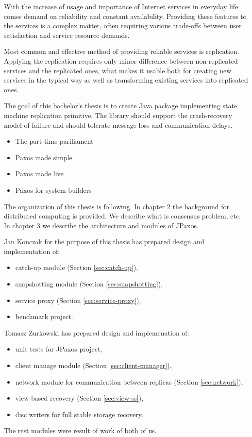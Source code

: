 
With the increase of usage and importance of Internet services in everyday life comes demand on reliability and constant availability.
Providing these features to the services is a complex matter, often requiring various trade-offs between user satisfaction and service resource demands.

Most common and effective method of providing reliable services is replication. Applying the replication requires only minor difference between non-replicated services and the replicated ones, what makes it usable both for creating new services in the typical way %
as well as transforming existing services into replicated ones.

The goal of this bachelor's thesis is to create Java package implementing state machine replication primitive. The library should support the crash-recovery model of failure and should tolerate message loss and communication delays.
 
\begin{itemize}
  \item The part-time pariliament
  \item Paxos made simple
  \item Paxos made live
  \item Paxos for system builders
\end{itemize}

The organization of this thesis is following. In chapter 2 the background for distributed computing is provided. We describe what is consensus problem, etc. In chapter 3 we describe the architecture and modules of JPaxos.

Jan Konczak for the purpose of this thesis has prepared design and implementation of:
\begin{itemize}
  \item catch-up module (Section \ref{sec:catch-up}),
  \item snapshotting module (Section \ref{sec:snapshotting}),
  \item service proxy (Section \ref{sec:service-proxy}),
  \item benchmark project.
\end{itemize}

Tomasz Zurkowski has prepared design and implemenation of:
\begin{itemize}
  \item unit tests for JPaxos project,
  \item client manage module (Section \ref{sec:client-manager}), 
  \item network module for communication between replicas (Section \ref{sec:network}),
  \item view based recovery (Section \ref{sec:view-ss}),
  \item disc writers for full stable storage recovery.
\end{itemize}

The rest modules were result of work of both of us.
